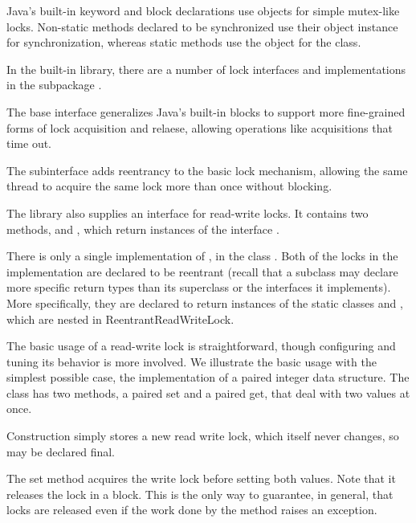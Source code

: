 Java's built-in  keyword and block declarations use
objects for simple mutex-like locks.  Non-static methods declared to
be synchronized use their object instance for synchronization, whereas
static methods use the object for the class.  

In the built-in  library, there are a
number of lock interfaces and implementations in the subpackage
.

The  base interface  generalizes Java's
built-in  blocks to support more fine-grained forms
of lock acquisition and relaese, allowing operations like acquisitions
that time out.  

The subinterface  adds reentrancy to the basic
lock mechanism, allowing the same thread to acquire the same lock more
than once without blocking.

The  library also supplies an interface
 for read-write locks.  It contains two
methods,  and , which return
instances of the interface .

There is only a single implementation of , in
the class .  Both of the locks in the
implementation are declared to be reentrant (recall that a subclass
may declare more specific return types than its superclass or the
interfaces it implements).  More specifically, they are declared to
return instances of the static classes 
and , which are nested in {ReentrantReadWriteLock}.

The basic usage of a read-write lock is straightforward, though
configuring and tuning its behavior is more involved.  We illustrate
the basic usage with the simplest possible case, the implementation of
a paired integer data structure.  The class has two methods, a paired
set and a paired get, that deal with two values at once.  

Construction simply stores a new read write lock, which itself
never changes, so may be declared final.
%
%

The set method acquires the write lock before setting both values.
%
%
Note that it releases the lock in a  block.  This is
the only way to guarantee, in general, that locks are released even if
the work done by the method raises an exception.

